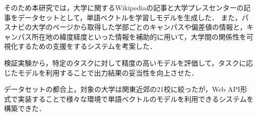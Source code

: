 そのため本研究では，大学に関するWikipediaの記事と大学プレスセンターの記事をデータセットとして，単語ベクトルを学習しモデルを生成した．
また，パスナビの大学のページから取得した学部ごとのキャンパスや偏差値の情報と，キャンパス所在地の緯度経度といった情報を補助的に用いて，大学間の関係性を可視化するための支援をするシステムを考案した．

検証実験から，特定のタスクに対して精度の高いモデルを評価して，タスクに応じたモデルを利用することで出力結果の妥当性を向上させた．

データセットの都合上，対象の大学は関東近郊の21校に絞ったが，Web API形式で実装することで様々な環境で単語ベクトルのモデルを利用できるシステムを構築できた．
